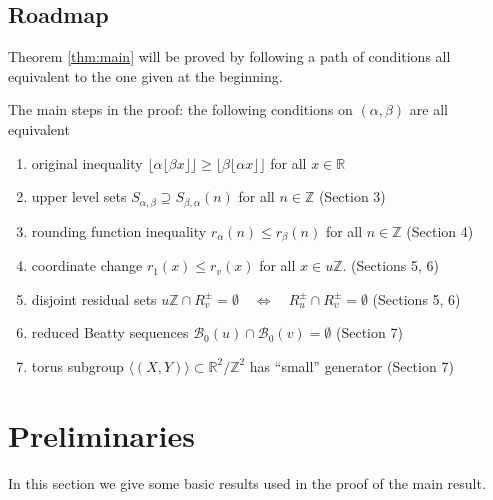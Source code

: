 \documentclass[12pt,letterpaper, reqno]{amsart}
\theoremstyle{definition}
\theoremstyle{remark}
\newcommand{\RR}{\ensuremath{\mathbb{R}}}
\newcommand{\ZZ}{\ensuremath{\mathbb{Z}}}
\newcommand{\sB}{{\mathcal B}}
\newcommand{\floor}[1]{\lfloor{#1}\rfloor}
\begin{document}
%
\subsection{Roadmap}

Theorem \ref{thm:main} will be proved by following a path of conditions all equivalent to the one given at the beginning. 

The main steps in the proof: the following conditions on $(\alpha,\beta)$ are all equivalent
\begin{enumerate}
\item original inequality $\floor{\alpha\floor{\beta x}} \geq \floor{\beta\floor{\alpha x}}$ {for all } $x\in \RR$ 
\item upper level sets $S_{\alpha,\beta}\supseteq S_{\beta,\alpha}(n)$ for all $n \in \ZZ$
(Section 3)
\item rounding function inequality $r_\alpha(n)\leq r_\beta(n)$ for all $n\in \ZZ$
(Section 4)
\item coordinate change $r_1(x)\leq r_v(x)$ for all $x\in u\ZZ$.
(Sections 5, 6)
\item disjoint residual sets $u\ZZ\cap R^\pm_v = \emptyset \quad\Leftrightarrow\quad R^\pm_u\cap R^\pm_v = \emptyset$ 
(Sections 5, 6)
\item reduced Beatty sequences $\sB_0(u)\cap\sB_0(v) = \emptyset$
(Section 7)
\item torus subgroup $\langle(X,Y)\rangle\subset\RR^2/\ZZ^2$ has ``small'' generator
(Section 7)

\end{enumerate}


%
%
\section{Preliminaries}\label{sec:2} 
\setcounter{equation}{0}

In this section we give some basic results used in the proof of the main result. 
%
%
\end{document}
